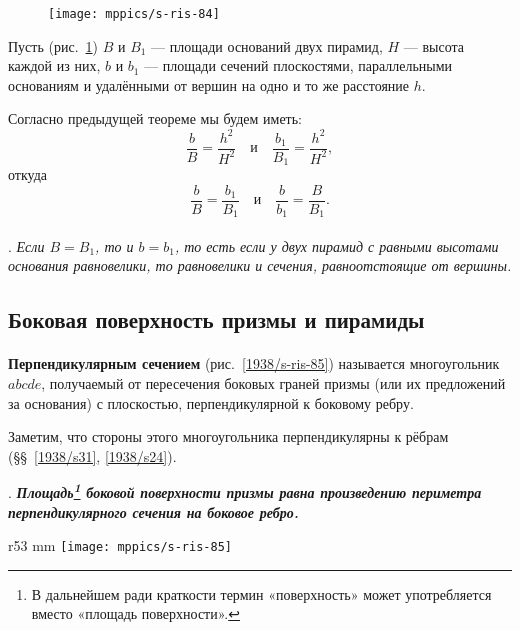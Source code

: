 \begin{figure}[!ht]%
\vskip-0mm
\centering
\texttt{[image: mppics/s-ris-84]}
\caption{}\label{1938/s-ris-84}
\vskip-0mm
\end{figure}

Пусть (рис.~\ref{1938/s-ris-84}) $B$ и $B_1$ — площади оснований двух пирамид, $H$ — высота каждой из них, $b$ и $b_1$ — площади сечений плоскостями, параллельными основаниям и удалёнными от вершин на одно и то же расстояние $h$.

Согласно предыдущей теореме мы будем иметь:
\[\frac{b}{B}=\frac{h^2}{H^2}\quad\text{и}\quad\frac{b_1}{B_1}=\frac{h^2}{H^2},\]
откуда
\[\frac{b}{B}=\frac{b_1}{B_1}\quad\text{и}\quad\frac{b}{b_1}=\frac{B}{B_1}.\]

\paragraph{}\label{1938/s77}
.
\emph{Если $B=B_1$, то и $b=b_1$, то есть если у двух пирамид с равными высотами основания равновелики, то равновелики и сечения, равноотстоящие от вершины.}


\subsection*{Боковая поверхность призмы и пирамиды}

\paragraph{}\label{1938/s78} \textbf{Перпендикулярным сечением} (рис.~\ref{1938/s-ris-85}) называется многоугольник $abcde$, получаемый от пересечения боковых граней призмы (или их предложений за основания) с плоскостью, перпендикулярной к боковому ребру.

Заметим, что стороны этого многоугольника перпендикулярны к рёбрам (§§~\ref{1938/s31}, \ref{1938/s24}).

\medskip

\mbox{.}
\textbf{\emph{Площадь\footnote{В дальнейшем ради краткости термин «поверхность» может употребляется вместо «площадь поверхности».} боковой поверхности призмы равна произведению периметра перпендикулярного сечения на боковое ребро.}}


\begin{wrapfigure}[14]{r}{53 mm}
\vskip-2mm
\centering
\texttt{[image: mppics/s-ris-85]}
\caption{}\label{1938/s-ris-85}
\vskip-0mm
\end{wrapfigure}

